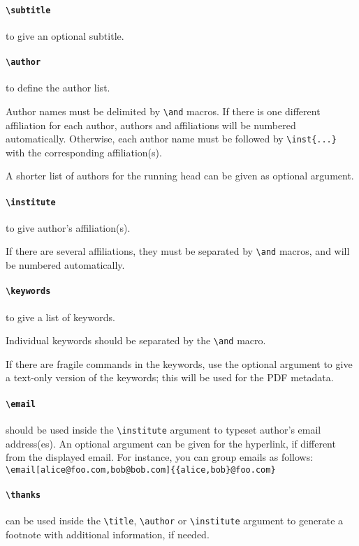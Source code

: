 \documentclass{iacrtrans}
\begin{document}
\paragraph{\texttt{\textbackslash subtitle}} to give an optional
subtitle.

\paragraph{\texttt{\textbackslash author}} to define the author list.

Author names must be delimited by \verb+\and+ macros.  If there is one
different affiliation for each author, authors and affiliations will be
numbered automatically.  Otherwise, each author name must be followed by
\verb+\inst{...}+ with the corresponding affiliation(s).

A shorter list of authors for the running head can be given as
optional argument.

\paragraph{\texttt{\textbackslash institute}} to give author's affiliation(s).

If there are several affiliations, they must be separated by
\verb+\and+ macros, and will be numbered automatically.

\paragraph{\texttt{\textbackslash keywords}} to give a list of
keywords.

Individual keywords should be separated by the \verb+\and+ macro.

If there are fragile commands in the keywords, use the optional argument
to give a text-only version of the keywords; this will be used for the
PDF metadata.

\paragraph{\texttt{\textbackslash email}} should be used inside the
\verb+\institute+ argument to typeset author's email address(es).  An
optional argument can be given for the hyperlink, if different from the
displayed email.  For instance, you can group emails as follows:\\
\verb+\email[alice@foo.com,bob@bob.com]{{alice,bob}@foo.com}+

\paragraph{\texttt{\textbackslash thanks}}
can be used inside the \verb+\title+,
\verb+\author+ or \verb+\institute+ argument to generate a footnote with additional
information, if needed.
\end{document}

